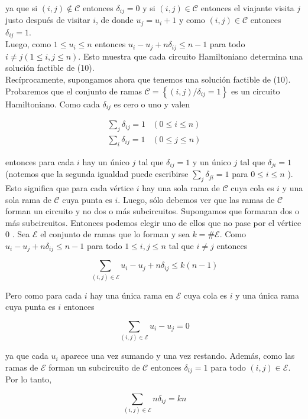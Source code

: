 \documentclass[10pt]{article}
\begin{document}
ya que si $(i, j) \notin \mathcal{C}$ entonces $\delta_{i j}=0$ y si $(i, j) \in \mathcal{C}$ entonces el viajante visita $j$ justo después de visitar $i$, de donde $u_{j}=u_{i}+1$ y como $(i, j) \in \mathcal{C}$ entonces $\delta_{i j}=1$.\\
Luego, como $1 \leq u_{i} \leq n$ entonces $u_{i}-u_{j}+n \delta_{i j} \leq n-1$ para todo $i \neq j(1 \leq i, j \leq n)$. Esto muestra que cada circuito Hamiltoniano determina una solución factible de (10).\\
Recíprocamente, supongamos ahora que tenemos una solución factible de (10). Probaremos que el conjunto de ramas $\mathcal{C}=\left\{(i, j) / \delta_{i j}=1\right\}$ es un circuito Hamiltoniano. Como cada $\delta_{i j}$ es cero o uno y valen

$$
\begin{array}{ll}
\sum_{j} \delta_{i j}=1 & (0 \leq i \leq n) \\
\sum_{i} \delta_{i j}=1 & (0 \leq j \leq n)
\end{array}
$$

entonces para cada $i$ hay un único $j$ tal que $\delta_{i j}=1$ y un único $j$ tal que $\delta_{j i}=1$ (notemos que la segunda igualdad puede escribirse $\sum_{j} \delta_{j i}=1$ para $0 \leq i \leq n$ ). Esto significa que para cada vértice $i$ hay una sola rama de $\mathcal{C}$ cuya cola es $i$ y una sola rama de $\mathcal{C}$ cuya punta es $i$. Luego, sólo debemos ver que las ramas de $\mathcal{C}$ forman un circuito y no dos o más subcircuitos. Supongamos que formaran dos o más subcircuitos. Entonces podemos elegir uno de ellos que no pase por el vértice 0 . Sea $\mathcal{E}$ el conjunto de ramas que lo forman y sea $k=\# \mathcal{E}$. Como $u_{i}-u_{j}+n \delta_{i j} \leq n-1$ para todo $1 \leq i, j \leq n$ tal que $i \neq j$ entonces

$$
\sum_{(i, j) \in \mathcal{E}} u_{i}-u_{j}+n \delta_{i j} \leq k(n-1)
$$

Pero como para cada $i$ hay una única rama en $\mathcal{E}$ cuya cola es $i$ y una única rama cuya punta es $i$ entonces

$$
\sum_{(i, j) \in \mathcal{E}} u_{i}-u_{j}=0
$$

ya que cada $u_{i}$ aparece una vez sumando y una vez restando. Además, como las ramas de $\mathcal{E}$ forman un subcircuito de $\mathcal{C}$ entonces $\delta_{i j}=1$ para todo $(i, j) \in \mathcal{E}$. Por lo tanto,

$$
\sum_{(i, j) \in \mathcal{E}} n \delta_{i j}=k n
$$
\end{document}

